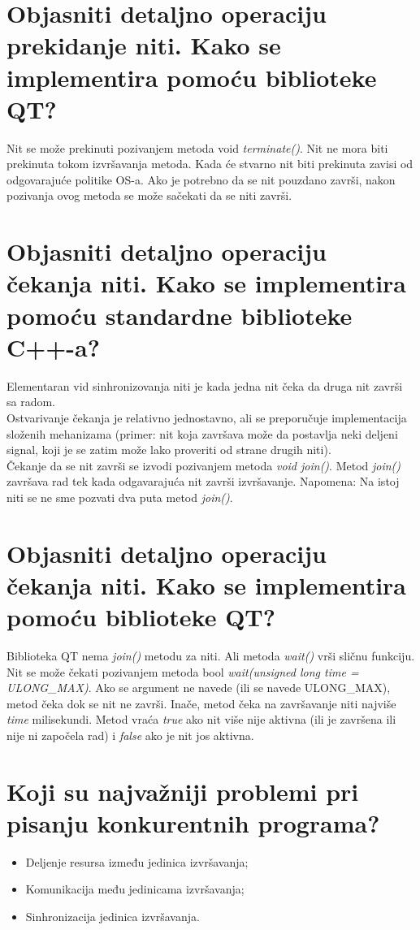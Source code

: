 \documentclass[a4paper]{article}
\begin{document}
\section{Objasniti detaljno operaciju prekidanje niti. Kako se implementira pomoću biblioteke QT?}
  Nit se može prekinuti pozivanjem metoda void \textit{terminate()}. 
  Nit ne mora biti prekinuta tokom izvršavanja metoda.
  Kada će stvarno nit biti prekinuta zavisi od odgovarajuće politike OS-a.
  Ako je potrebno da se nit pouzdano završi, nakon pozivanja ovog metoda se može sačekati 
  da se niti završi.
  
\section{Objasniti detaljno operaciju čekanja niti. Kako se implementira pomoću standardne
         biblioteke C++-a?}
  Elementaran vid sinhronizovanja niti je kada jedna nit čeka da druga nit završi sa radom. \\

  Ostvarivanje čekanja je relativno jednostavno, ali se preporučuje implementacija složenih
  mehanizama (primer: nit koja završava može da postavlja neki deljeni signal, koji je se zatim
  može lako proveriti od strane drugih niti). \\

  Čekanje da se nit završi se izvodi pozivanjem metoda \textit{void join()}. Metod \textit{join()}
  završava rad tek kada odgavarajuća nit završi izvršavanje. Napomena: Na istoj niti se ne sme 
  pozvati dva puta metod \textit{join()}. 

\section{Objasniti detaljno operaciju čekanja niti. Kako se implementira pomoću biblioteke QT?}
  Biblioteka QT nema \textit{join()} metodu za niti. Ali metoda \textit{wait()} vrši sličnu
  funkciju. Nit se može čekati pozivanjem metoda bool \textit{wait(unsigned long time = ULONG\_MAX)}. 
  Ako se argument ne navede (ili se navede ULONG\_MAX), metod čeka dok se nit ne završi. 
  Inače, metod čeka na završavanje niti najviše \textit{time} milisekundi. 
  Metod vraća \textit{true} ako nit više nije aktivna (ili je završena ili nije ni započela rad) 
  i \textit{false} ako je nit jos aktivna.

\section{Koji su najvažniji problemi pri pisanju konkurentnih programa?}
  \begin{itemize}
    \item Deljenje resursa između jedinica izvršavanja;
    \item Komunikacija među jedinicama izvršavanja;
    \item Sinhronizacija jedinica izvršavanja.
  \end{itemize}
  
\end{document}
